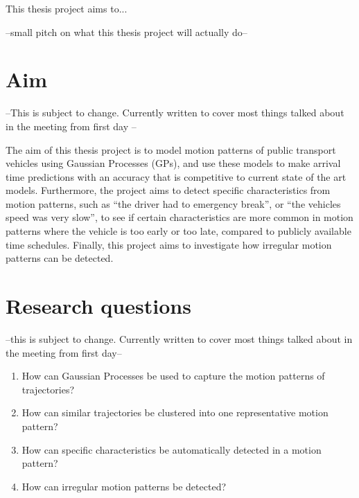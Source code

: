 This thesis project aims to...

--small pitch on what this thesis project will actually do--

\section{Aim}
\label{sec:aim}
--This is subject to change. Currently written to cover most things
talked about in the meeting from first day --

The aim of this thesis project is to model motion patterns of public
transport vehicles using Gaussian Processes (GPs), and use these
models to make arrival time predictions with an accuracy that is
competitive to current state of the art models. Furthermore, the project aims to
detect specific characteristics from motion patterns, such as ``the
driver had to emergency break'', or ``the vehicles speed was very slow'', to see if certain characteristics
are more common in motion patterns where the vehicle is too early or
too late, compared to publicly available time schedules. Finally, this
project aims to investigate how irregular motion patterns can be
detected.

\section{Research questions}
\label{sec:research-questions}

--this is subject to change. Currently written to cover most things
talked about in the meeting from first day--

\begin{enumerate}
\item How can Gaussian Processes be used to capture the motion patterns
  of trajectories?

\item How can similar trajectories be clustered
  into one representative motion pattern? 
  
\item How can specific characteristics be automatically detected in a
  motion pattern?

\item How can irregular motion patterns be detected?
\end{enumerate}


